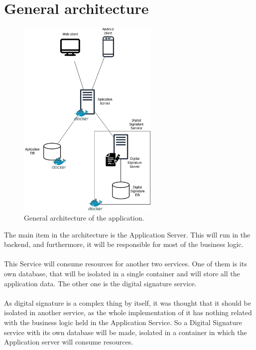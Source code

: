 \documentclass[./main.tex]{subfiles}
\begin{document}
\hypertarget{general-architecture}{%
\section{General architecture}\label{general-architecture}}

\begin{figure}[h]
\centering
\includegraphics[width=0.6\textwidth]{architecture_diagram/Architecture.drawio.png}
\caption{General architecture of the application.}
\end{figure}

The main item in the architecture is the Application Server. This 
will run in the backend, and furthermore, it will be
responsible for most of the business logic.
\\
\\

This Service will consume resources for another two services. One of
them is its own database, that will be isolated in a single container
and will store all the application data. The other one is the digital
signature service.
\\
\\

As digital signature is a complex thing by itself, it was thought that
it should be isolated in another service, as the whole implementation of
it has nothing related with the business logic held in the Application
Service. So a Digital Signature service with its own database will be
made, isolated in a container in which the Application server will
consume resources.
\\
\\
\end{document}
